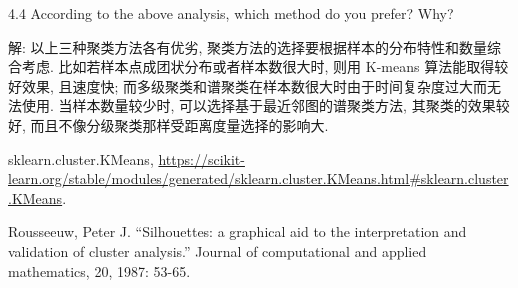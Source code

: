 \documentclass{article}
\begin{document}
4.4 According to the above analysis, which method do you prefer? Why?

解: 以上三种聚类方法各有优劣, 聚类方法的选择要根据样本的分布特性和数量综合考虑. 比如若样本点成团状分布或者样本数很大时, 则用 K-means 算法能取得较好效果, 且速度快; 而多级聚类和谱聚类在样本数很大时由于时间复杂度过大而无法使用. 当样本数量较少时, 可以选择基于最近邻图的谱聚类方法, 其聚类的效果较好, 而且不像分级聚类那样受距离度量选择的影响大.

\begin{thebibliography}{1}


sklearn.cluster.KMeans, \url{https://scikit-learn.org/stable/modules/generated/sklearn.cluster.KMeans.html#sklearn.cluster.KMeans}.


Rousseeuw, Peter J. ``Silhouettes: a graphical aid to the interpretation and validation of cluster analysis.'' Journal of computational and applied mathematics, 20, 1987: 53-65.

\end{thebibliography}
\end{document}
